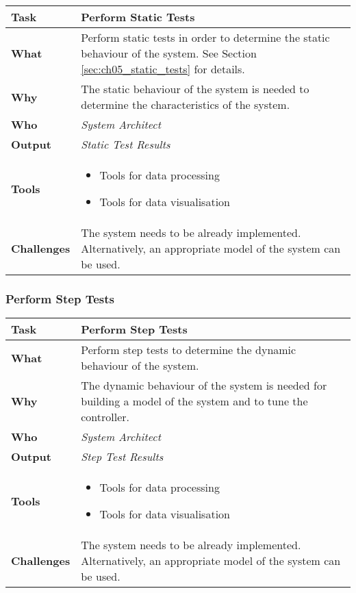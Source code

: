 \begin{tabularx}{\textwidth}{@{} l X @{}}
	\caption{Perform Static Tests} \label{table:ch6_Task_Static_Tests}\\
	\toprule 
	\bfseries Task & Perform Static Tests\\
	\midrule 
	\bfseries What & Perform static tests in order to determine the static behaviour of the system. See Section \ref{sec:ch05_static_tests} for details.\\
	\midrule 
	\bfseries Why & The static behaviour of the system is needed to determine the characteristics of the system.\\
	\midrule 
	\bfseries Who & \emph{System Architect}\\
	\midrule 
	\bfseries Output & \emph{Static Test Results}\\
	\midrule 
	\bfseries Tools & 
	\begin{itemize}
		\item Tools for data processing
		\item Tools for data visualisation
	\end{itemize}\\
	\midrule
	\bfseries Challenges & The system needs to be already implemented. Alternatively, an appropriate model of the system can be used.
	\\
	\bottomrule
\end{tabularx}

\subsubsection{Perform Step Tests}

\begin{tabularx}{\textwidth}{@{} l X @{}}
	\caption{Perform Step Tests} \label{table:ch6_Task_Step_Tests}\\
	\toprule 
	\bfseries Task & Perform Step Tests\\
	\midrule 
	\bfseries What & Perform step tests to determine the dynamic behaviour of the system.\\
	\midrule 
	\bfseries Why & The dynamic behaviour of the system is needed for building a model of the system and to tune the controller.\\
	\midrule 
	\bfseries Who & \emph{System Architect}\\
	\midrule 
	\bfseries Output & \emph{Step Test Results}\\
	\midrule 
	\bfseries Tools & 
	\begin{itemize}
		\item Tools for data processing
		\item Tools for data visualisation
	\end{itemize}\\
	\midrule
	\bfseries Challenges & The system needs to be already implemented. Alternatively, an appropriate model of the system can be used.
	\\
	\bottomrule 
\end{tabularx}


